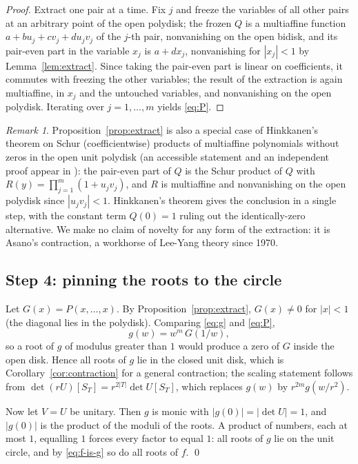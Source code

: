 \documentclass[11pt]{amsart}
\theoremstyle{definition}
\theoremstyle{remark}
\newtheorem{remark}[theorem]{Remark}
\begin{document}
\begin{proof}
Extract one pair at a time. Fix $j$ and freeze the variables of all other pairs at an arbitrary point of the open polydisk; the frozen $Q$ is a multiaffine function $a + bu_j + cv_j + du_jv_j$ of the $j$-th pair, nonvanishing on the open bidisk, and its pair-even part in the variable $x_j$ is $a + dx_j$, nonvanishing for $|x_j| < 1$ by Lemma~\ref{lem:extract}. Since taking the pair-even part is linear on coefficients, it commutes with freezing the other variables; the result of the extraction is again multiaffine, in $x_j$ and the untouched variables, and nonvanishing on the open polydisk. Iterating over $j = 1, \ldots, m$ yields \eqref{eq:P}.
\end{proof}

\begin{remark}\label{rem:hinkkanen}
Proposition~\ref{prop:extract} is also a special case of Hinkkanen's theorem on Schur (coefficientwise) products of multiaffine polynomials without zeros in the open unit polydisk \cite{Hin97} (an accessible statement and an independent proof appear in \cite[Prop.~4.20 and the remark following it]{COSW04}): the pair-even part of $Q$ is the Schur product of $Q$ with $R(y) = \prod_{j=1}^m (1 + u_j v_j)$, and $R$ is multiaffine and nonvanishing on the open polydisk since $|u_j v_j| < 1$. Hinkkanen's theorem gives the conclusion in a single step, with the constant term $Q(0) = 1$ ruling out the identically-zero alternative. We make no claim of novelty for any form of the extraction: it is Asano's contraction, a workhorse of Lee-Yang theory since 1970.
\end{remark}

\subsection*{Step 4: pinning the roots to the circle}
Let $G(x) = P(x, \ldots, x)$. By Proposition~\ref{prop:extract}, $G(x) \ne 0$ for $|x| < 1$ (the diagonal lies in the polydisk). Comparing \eqref{eq:g} and \eqref{eq:P},
\[
g(w) = w^m\, G(1/w),
\]
so a root of $g$ of modulus greater than $1$ would produce a zero of $G$ inside the open disk. Hence all roots of $g$ lie in the closed unit disk, which is Corollary~\ref{cor:contraction} for a general contraction; the scaling statement follows from $\det (rU)[S_T] = r^{2|T|} \det U[S_T]$, which replaces $g(w)$ by $r^{2m} g(w/r^2)$.

Now let $V = U$ be unitary. Then $g$ is monic with $|g(0)| = |\det U| = 1$, and $|g(0)|$ is the product of the moduli of the roots. A product of numbers, each at most $1$, equalling $1$ forces every factor to equal $1$: all roots of $g$ lie on the unit circle, and by \eqref{eq:f-is-g} so do all roots of $f$. \qed
\end{document}
